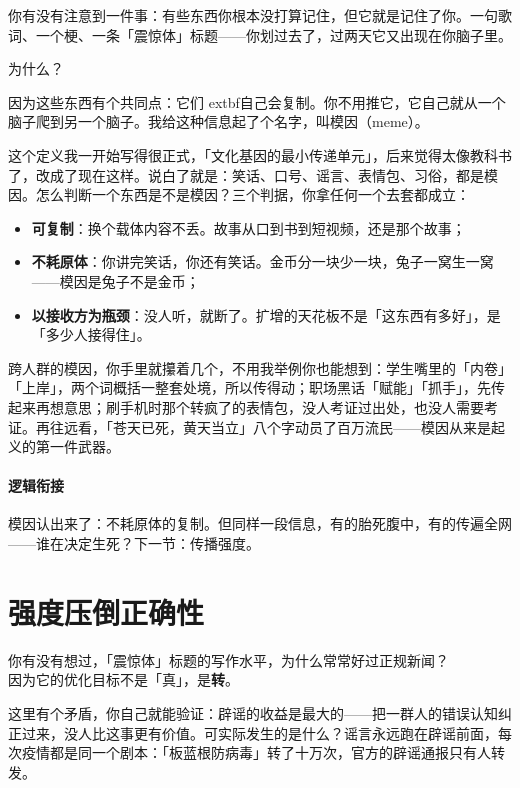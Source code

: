 \documentclass[../../main2.tex]{subfiles}
\begin{document}
你有没有注意到一件事：有些东西你根本没打算记住，但它就是记住了你。一句歌词、一个梗、一条「震惊体」标题——你划过去了，过两天它又出现在你脑子里。

为什么？

因为这些东西有个共同点：它们	extbf{自己会复制}。你不用推它，它自己就从一个脑子爬到另一个脑子。我给这种信息起了个名字，叫模因（meme）。

这个定义我一开始写得很正式，「文化基因的最小传递单元」，后来觉得太像教科书了，改成了现在这样。说白了就是：笑话、口号、谣言、表情包、习俗，都是模因。怎么判断一个东西是不是模因？三个判据，你拿任何一个去套都成立：

\begin{itemize}
	\item \textbf{可复制}：换个载体内容不丢。故事从口到书到短视频，还是那个故事；
	\item \textbf{不耗原体}：你讲完笑话，你还有笑话。金币分一块少一块，兔子一窝生一窝——模因是兔子不是金币；
	\item \textbf{以接收方为瓶颈}：没人听，就断了。扩增的天花板不是「这东西有多好」，是「多少人接得住」。
\end{itemize}

跨人群的模因，你手里就攥着几个，不用我举例你也能想到：学生嘴里的「内卷」「上岸」，两个词概括一整套处境，所以传得动；职场黑话「赋能」「抓手」，先传起来再想意思；刷手机时那个转疯了的表情包，没人考证过出处，也没人需要考证。再往远看，「苍天已死，黄天当立」八个字动员了百万流民——模因从来是起义的第一件武器。

\paragraph*{逻辑衔接}
	模因认出来了：不耗原体的复制。但同样一段信息，有的胎死腹中，有的传遍全网——谁在决定生死？下一节：传播强度。

\section{强度压倒正确性}

\begin{readingnote}
	你有没有想过，「震惊体」标题的写作水平，为什么常常好过正规新闻？\\
	因为它的优化目标不是「真」，是\textbf{转}。
\end{readingnote}

这里有个矛盾，你自己就能验证：辟谣的收益是最大的——把一群人的错误认知纠正过来，没人比这事更有价值。可实际发生的是什么？谣言永远跑在辟谣前面，每次疫情都是同一个剧本：「板蓝根防病毒」转了十万次，官方的辟谣通报只有人转发。
\end{document}
